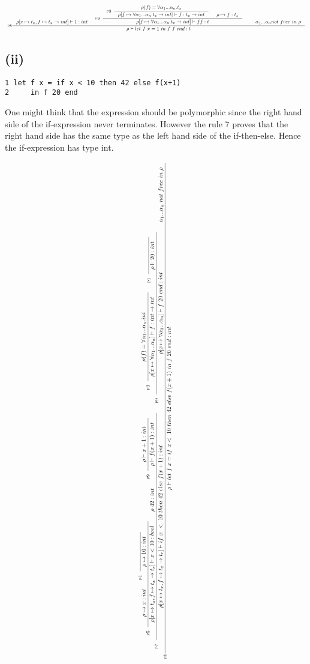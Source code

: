 \documentclass[a4paper]{article}
\newcommand{\RULE}[1]{\textsc{#1}}
\begin{document}
$$
  \scalebox{0.6}{
    \inference[\RULE{p8}]{
      \rho[x \mapsto t_x, f \mapsto t_x \to int] \vdash 1 : int &
      \inference[\RULE{p9}]{
        \inference[\RULE{p3}]{
          \rho (f) = \forall \alpha_1 ... \alpha_n.t_x
        }{
          \rho [f \mapsto \forall \alpha_1 ... \alpha_n.t_x \to int] \vdash f : t_x \to int
        } &
        \rho \mapsto f : t_x
      }{
        \rho[f \mapsto \forall \alpha_1 ... \alpha_n.t_x \to int] \vdash ff : t 
      } &
      \quad \alpha_1 ... \alpha_n not\ free\ in\ \rho
    }{
      \rho \vdash let\ f\ x = 1\ in\ f\ f\ end : t
    }
  }
$$

\subsection*{(ii)}
\begin{verbatim}
1 let f x = if x < 10 then 42 else f(x+1)
2     in f 20 end
\end{verbatim}

One might think that the expression should be polymorphic since the right hand side of the if-expression never terminates. However the rule 7 proves that the right hand side has the same type as the left hand side of the if-then-else. Hence the if-expression has type int. 

$$
\scalebox{0.7}{
  \rotatebox{90}{
  \inference[\RULE{p8}]{
    \inference[\RULE{p7}]{
      \inference[\RULE{p5}]{
        \rho \mapsto x : int &
        \inference[\RULE{p1}]{}{\rho \mapsto 10 : int}
      }{
        \rho [x \mapsto t_x, f \mapsto t_x \to t_r] \vdash x < 10 : bool
      } &
      \rho\ 42 : int &
      \inference[\RULE{p9}]{
        \rho \vdash x + 1 : int
      }{
        \rho \vdash f(x + 1) : int
      }
    }{
      \rho [x \mapsto t_x, f \mapsto t_x \to t_r] \vdash if\ x\ <\ 10\ then\ 42\ else\ f(x+1) : int
    } &
    \inference[\RULE{p9}]{
      \inference[\RULE{p3}]{
        \rho(f) = \forall \alpha_1 ... \alpha_n.int
      }{
        \rho [x \mapsto \forall \alpha_1 ... \alpha_n] \vdash f : int \to int
      } &
      \inference[\RULE{p1}]{}{\rho \vdash 20 : int}
    }{
      \rho [x \mapsto \forall \alpha_1 ... \alpha_n] \vdash f\ 20\ end : int
    } &
    \alpha_1 ... \alpha_n\ not\ free\ in\ \rho
  }{
    \rho \vdash let\ f\ x = if\ x <\ 10\ then\ 42\ else\ f(x+1)\ in\ f\ 20\ end : int
  }
}
}
$$
\end{document}
